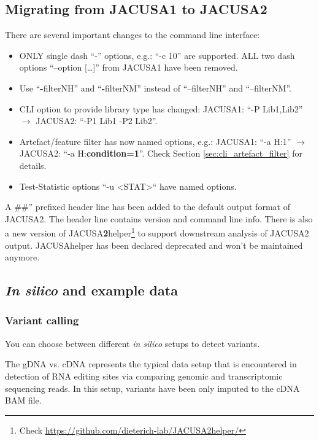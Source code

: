 \documentclass[10pt,a4paper]{article} \usepackage[utf8]{inputenc}
\begin{document}
\subsection{Migrating from JACUSA1 to JACUSA2}\label{sec:migration}
There are several important changes to the command line interface:
\begin{itemize}
  \item ONLY single dash ``-'' options, e.g.: ``-c 10'' are supported. ALL two dash options
  ``--option [\ldots]'' from JACUSA1 have been removed.
  \item Use ``\textbf{-}filterNH'' and ``\textbf{-}filterNM'' instead of ``--filterNH'' and
  ``--filterNM''.
  \item CLI option to provide library type has changed: JACUSA1: ``-P Lib1,Lib2'' $\rightarrow$
  JACUSA2: ``-P1 Lib1 -P2 Lib2''.
  \item Artefact/feature filter has now named options, e.g.: JACUSA1: ``-a H:1'' $\rightarrow$
  JACUSA2: ``-a H:\textbf{condition=1}''. Check Section \ref{sec:cli_artefact_filter} for details.
  \item Test-Statistic options ``-u <STAT>`` have named options.
\end{itemize}
A \#\#'' prefixed header line has been added to the default output format of JACUSA2. The header
line contains version and command line info.
There is also a new version of JACUSA\textbf{2}helper\footnote{Check 
\url{https://github.com/dieterich-lab/JACUSA2helper/}} to support downstream
analysis of JACUSA2 output. JACUSAhelper has been declared deprecated and won't be maintained
anymore.
\subsection{\textit{In silico} and example data}
\subsubsection{Variant calling}
You can choose between different \textit{in silico} setups to detect variants. 

The gDNA vs. cDNA represents the typical data setup that is encountered in detection of RNA editing
sites via comparing genomic and transcriptomic sequencing reads. In this setup, variants have been
only imputed to the cDNA BAM file.
\end{document}

